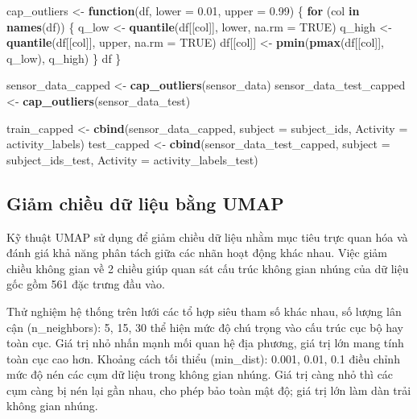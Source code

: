 \documentclass[
]{article}
\newenvironment{Shaded}{\begin{snugshade}}{\end{snugshade}}
\newcommand{\AttributeTok}[1]{\textcolor[rgb]{0.13,0.29,0.53}{#1}}
\newcommand{\ConstantTok}[1]{\textcolor[rgb]{0.56,0.35,0.01}{#1}}
\newcommand{\ControlFlowTok}[1]{\textcolor[rgb]{0.13,0.29,0.53}{\textbf{#1}}}
\newcommand{\FloatTok}[1]{\textcolor[rgb]{0.00,0.00,0.81}{#1}}
\newcommand{\FunctionTok}[1]{\textcolor[rgb]{0.13,0.29,0.53}{\textbf{#1}}}
\newcommand{\NormalTok}[1]{#1}
\newcommand{\OtherTok}[1]{\textcolor[rgb]{0.56,0.35,0.01}{#1}}
\begin{document}
\begin{Shaded}
\begin{Highlighting}[]
\NormalTok{ cap\_outliers }\OtherTok{\textless{}{-}} \ControlFlowTok{function}\NormalTok{(df, }\AttributeTok{lower =} \FloatTok{0.01}\NormalTok{, }\AttributeTok{upper =} \FloatTok{0.99}\NormalTok{) \{}
   \ControlFlowTok{for}\NormalTok{ (col }\ControlFlowTok{in} \FunctionTok{names}\NormalTok{(df)) \{}
\NormalTok{     q\_low }\OtherTok{\textless{}{-}} \FunctionTok{quantile}\NormalTok{(df[[col]], lower, }\AttributeTok{na.rm =} \ConstantTok{TRUE}\NormalTok{)}
\NormalTok{     q\_high }\OtherTok{\textless{}{-}} \FunctionTok{quantile}\NormalTok{(df[[col]], upper, }\AttributeTok{na.rm =} \ConstantTok{TRUE}\NormalTok{)}
\NormalTok{     df[[col]] }\OtherTok{\textless{}{-}} \FunctionTok{pmin}\NormalTok{(}\FunctionTok{pmax}\NormalTok{(df[[col]], q\_low), q\_high)}
\NormalTok{   \}}
\NormalTok{   df}
\NormalTok{ \}}

\NormalTok{ sensor\_data\_capped }\OtherTok{\textless{}{-}} \FunctionTok{cap\_outliers}\NormalTok{(sensor\_data)}
\NormalTok{ sensor\_data\_test\_capped }\OtherTok{\textless{}{-}} \FunctionTok{cap\_outliers}\NormalTok{(sensor\_data\_test)}

\NormalTok{ train\_capped }\OtherTok{\textless{}{-}} \FunctionTok{cbind}\NormalTok{(sensor\_data\_capped, }\AttributeTok{subject =}\NormalTok{ subject\_ids, }\AttributeTok{Activity =}\NormalTok{ activity\_labels)}
\NormalTok{ test\_capped }\OtherTok{\textless{}{-}} \FunctionTok{cbind}\NormalTok{(sensor\_data\_test\_capped, }\AttributeTok{subject =}\NormalTok{ subject\_ids\_test, }\AttributeTok{Activity =}\NormalTok{ activity\_labels\_test)}
\end{Highlighting}
\end{Shaded}

\subsection{Giảm chiều dữ liệu bằng
UMAP}\label{giux1ea3m-chiux1ec1u-dux1eef-liux1ec7u-bux1eb1ng-umap}

Kỹ thuật UMAP sử dụng để giảm chiều dữ liệu nhằm mục tiêu trực quan hóa
và đánh giá khả năng phân tách giữa các nhãn hoạt động khác nhau. Việc
giảm chiều không gian về 2 chiều giúp quan sát cấu trúc không gian nhúng
của dữ liệu gốc gồm 561 đặc trưng đầu vào.

Thử nghiệm hệ thống trên lưới các tổ hợp siêu tham số khác nhau, số
lượng lân cận (n\_neighbors): 5, 15, 30 thể hiện mức độ chú trọng vào
cấu trúc cục bộ hay toàn cục. Giá trị nhỏ nhấn mạnh mối quan hệ địa
phương, giá trị lớn mang tính toàn cục cao hơn. Khoảng cách tối thiểu
(min\_dist): 0.001, 0.01, 0.1 điều chỉnh mức độ nén các cụm dữ liệu
trong không gian nhúng. Giá trị càng nhỏ thì các cụm càng bị nén lại gần
nhau, cho phép bảo toàn mật độ; giá trị lớn làm dàn trải không gian
nhúng.
\end{document}
